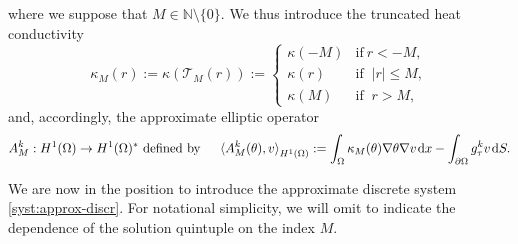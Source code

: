 \documentclass[a4paper,10pt,reqno]{amsart}
\numberwithin{equation}{section}
\newcommand{\R}{\mathbb{R}}
\newcommand{\N}{\mathbb{N}}
\numberwithin{equation}{section}
\def\dd{\;\!\mathrm{d}} %
\newcommand{\pairing}[4]{ \sideset{_{ #1 }}{_{ #2 }}  {\mathop{\langle #3 , #4
\rangle}}}
\newcommand{\condu}{\kappa}
\newcommand{\gtau}[1]{g_\tau^{#1}}
\begin{document}
where  we suppose that  $M\in \N\setminus\{0\}$. 
We thus introduce the  truncated heat conductivity
\begin{equation}
\label{def-k-m} \condu_M(r):= \condu(\mathcal{T}_M(r)) := \left\{ \begin{array}{ll} \condu(-M) & \text{if
} \  r <-M,
\\
\condu(r)   & \text{if } \  |r| \leq M,
\\
\condu(M) & \text{if } \ r >M,
\end{array}
\right.
\end{equation}
and, accordingly, the approximate elliptic operator
\begin{equation}
\label{M-operator}
{A}_M^k: H^1(\Omega)  \to H^1(\Omega)^*
  \text{  defined  by } \quad
\pairing{}{H^1(\Omega)} { {A}_M^k(\theta)}{v}:= \int_\Omega \condu_M(\theta) \nabla \theta  \nabla v \dd x -
\int_{\partial \Omega} \gtau{k}v \dd S.
\end{equation}
\par
We are now in the position to introduce the approximate discrete system \eqref{syst:approx-discr}. For notational simplicity, we will omit to indicate the dependence of the solution  quintuple 
on the index $M$.
\end{document}
